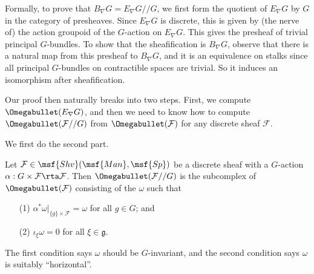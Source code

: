 \begin{remark}
  Formally, to prove that $B_\nabla G = E_\nabla G // G$, we first form the quotient of $E_\nabla G$ by $G$ in the category of presheaves. Since $E_\nabla G$ is discrete, this is given by (the nerve of) the action groupoid of the $G$-action on $E_\nabla G$. This gives the presheaf of trivial principal $G$-bundles. To show that the sheafification is $B_\nabla G$, observe that there is a natural map from this presheaf to $B_\nabla G$, and it is an equivalence on stalks since all principal $G$-bundles on contractible spaces are trivial. So it induces an isomorphism after sheafification.
\end{remark}

Our proof then naturally breaks into two steps. First, we compute $\Omegabullet(E_\nabla G)$, and then we need to know how to compute $\Omegabullet(\mathcal{F}// G)$ from $\Omegabullet (\mathcal{F})$ for any discrete sheaf $\mathcal{F}$.

We first do the second part.

\begin{lem}\label{lemma:omega-mod-g}
  Let $\mathcal{F} \in \msf{Shv}(\msf{Man}, \msf{Sp})$ be a discrete sheaf with a $G$-action $\alpha: G \times \mathcal{F} \rta \mathcal{F}$. Then $\Omegabullet(\mathcal{F} // G)$ is the subcomplex of $\Omegabullet(\mathcal{F})$ consisting of the $\omega$ such that
  \begin{enumerate}
    \item[(1)] $\alpha^* \omega|_{\{g\} \times \mathcal{F}} = \omega$ for all $g \in G$; and
    \item[(2)] $\iota_\xi \omega = 0$ for all $\xi \in \mathfrak{g}$.
  \end{enumerate}
\end{lem}
The first condition says $\omega$ should be $G$-invariant, and the second condition says $\omega$ is suitably ``horizontal''.

